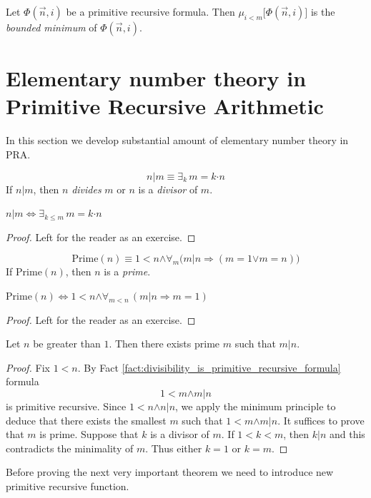 \documentclass[10pt]{amsart}
\newcommand{\mforall}{\boldsymbol{\forall}}
\newcommand{\mexists}{\boldsymbol{\exists}}
\newcommand{\mra}{\boldsymbol{\Rightarrow}}
\newcommand{\mequiv}{\boldsymbol{\Leftrightarrow}}
\newcommand{\mand}{\boldsymbol{\wedge}}
\newcommand{\mor}{\boldsymbol{\vee}}
\newcommand{\mle}{\boldsymbol{<}}
\newcommand{\mleq}{\boldsymbol{\leq}}
\newcommand{\meq}{\boldsymbol{=}}
\newcommand{\mdot}{\boldsymbol{\cdot}}
\begin{document}
\begin{definition}
	Let $\Phi(\vec{n},i)$ be a primitive recursive formula. Then $\mu_{i \mle m}\big[\Phi(\vec{n},i)\big]$ is the \textit{bounded minimum} of $\Phi(\vec{n},i)$.
\end{definition}

\section{Elementary number theory in Primitive Recursive Arithmetic}
\noindent
In this section we develop substantial amount of elementary number theory in $\mathrm{PRA}$.

\begin{definition}
	$$n|m \equiv \mexists_k\,m \meq k\mdot n$$
	If $n|m$, then $n$ \textit{divides} $m$ or $n$ is a \textit{divisor} of $m$.
\end{definition}

\begin{fact}\label{fact:divisibility_is_primitive_recursive_formula}
	$n|m \mequiv \mexists_{k \mleq m}\,m \meq k \mdot n$
\end{fact}
\begin{proof}
	Left for the reader as an exercise.
\end{proof}

\begin{definition}
	$$\mathrm{Prime}(n) \equiv 1 \mle n \mand \mforall_{m}\big(m|n \mra \left(m \meq 1 \mor m \meq n\right)\big)$$
	If $\mathrm{Prime}(n)$, then $n$ is a \textit{prime}.
\end{definition}

\begin{fact}\label{fact:prime_is_primitive_recursive_formula}
	$\mathrm{Prime}(n) \mequiv 1 \mle n \mand \mforall_{m \mle n}\,\left(m|n \mra m \meq 1\right)$
\end{fact}
\begin{proof}
	Left for the reader as an exercise.
\end{proof}

\begin{proposition}\label{proposition:every_nonzero_number_has_prime_divisor}
	Let $n$ be greater than $1$. Then there exists prime $m$ such that $m|n$.
\end{proposition}
\begin{proof}
	Fix $1 \mle n$. By Fact \ref{fact:divisibility_is_primitive_recursive_formula} formula
	$$1 \mle m \mand m|n$$
	is primitive recursive. Since $1 \mle n \mand n|n$, we apply the minimum principle to deduce that there exists the smallest $m$ such that $1 \mle m \mand m|n$. It suffices to prove that $m$ is prime. Suppose that $k$ is a divisor of $m$. If $1 \mle k \mle m$, then $k|n$ and this contradicts the minimality of $m$. Thus either $k \meq 1$ or $k \meq m$.
\end{proof}
\noindent
Before proving the next very important theorem we need to introduce new primitive recursive function.
\end{document}
